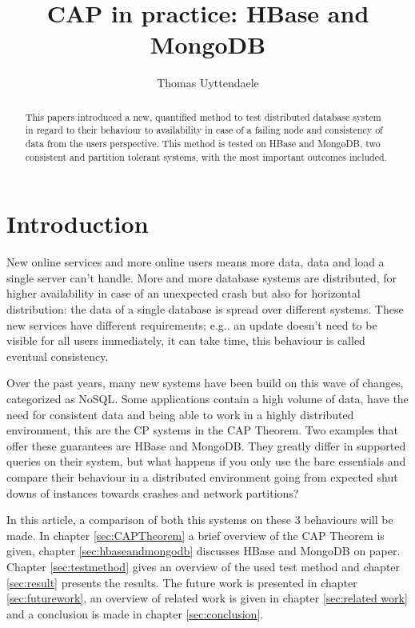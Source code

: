 \documentclass[10pt,conference,letterpaper]{IEEEtran}
\title{CAP in practice: HBase and MongoDB}
\author{Thomas Uyttendaele}
\begin{document}
\maketitle

\begin{abstract}
This papers introduced a new, quantified method to test distributed database system in regard to their behaviour to availability in case of a failing node and consistency of data from the users perspective. This method is tested on HBase and MongoDB, two consistent and partition tolerant systems, with the most important outcomes included. 
\end{abstract}


\section{Introduction}

New online services and more online users means more data, data and load a single server can't handle. More and more database systems are distributed, for higher availability in case of an unexpected crash but also for horizontal distribution: the data of a single database is spread over different systems. These new services have different requirements; e.g.. an update doesn't need to be visible for all users immediately, it can take time, this behaviour is called eventual consistency. 

Over the past years, many new systems have been build on this wave of changes, categorized as NoSQL. Some applications contain a high volume of data, have the need for consistent data and being able to work in a highly distributed environment, this are the CP systems in the CAP Theorem. Two examples that offer these guarantees are HBase and MongoDB. They greatly differ in supported queries on their system, but what happens if you only use the bare essentials and compare their behaviour in a distributed environment going from expected shut downs of instances towards crashes and network partitions? 

In this article, a comparison of both this systems on these 3 behaviours will be made. In chapter \ref{sec:CAPTheorem} a brief overview of the CAP Theorem is given, chapter \ref{sec:hbaseandmongodb} discusses HBase and MongoDB on paper. Chapter \ref{sec:testmethod} gives an overview of the used test method and chapter \ref{sec:result} presents the results. The future work is presented in chapter \ref{sec:futurework}, an overview of related work is given in chapter \ref{sec:related work} and a conclusion is made in chapter \ref{sec:conclusion}.  
\end{document}
